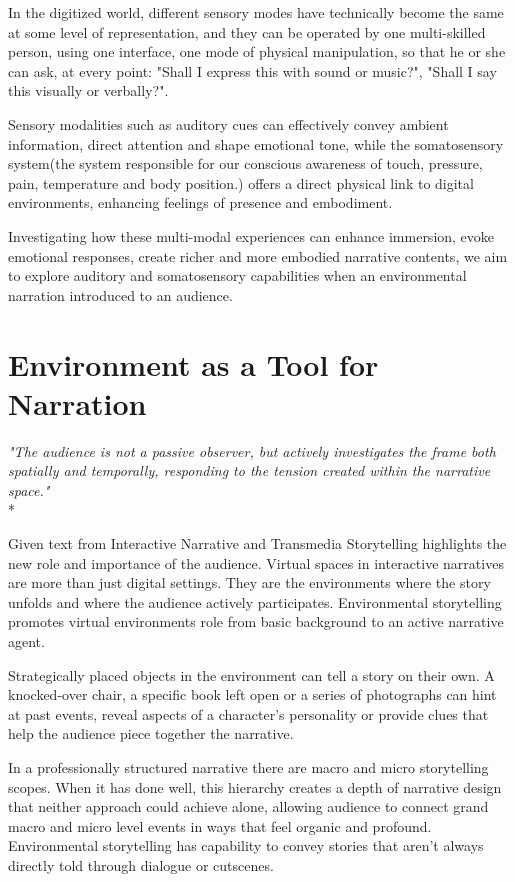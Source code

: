     In the digitized world, different sensory modes have technically become the same at some level of representation, and they can be operated by one multi-skilled person, using one interface, one mode of physical manipulation, so that he or she can ask, at every point: "Shall I express this with sound or music?", "Shall I say this visually or verbally?"\cite{Multimodal_Discourse}.

    Sensory modalities such as auditory cues can effectively convey ambient information, direct attention and shape emotional tone, while the somatosensory system(the system responsible for our conscious awareness of touch, pressure, pain, temperature and body position\cite{Somatic_Sensory}.) offers a direct physical link to digital environments, enhancing feelings of presence and embodiment. 

    Investigating how these multi-modal experiences can enhance immersion, evoke emotional responses, create richer and more embodied narrative contents, we aim to explore auditory and somatosensory capabilities when an environmental narration introduced to an audience.
    \section{Environment as a Tool for Narration} 
    \emph{"The audience is not a passive observer, but actively investigates the frame both spatially and temporally, responding to the tension created within the narrative space\cite{Transmedia_Storytelling}."}
    \\*

    Given text from Interactive Narrative and Transmedia Storytelling highlights the new role and importance of the audience. Virtual spaces in interactive narratives are more than just digital settings. They are the environments where the story unfolds and where the audience actively participates. Environmental storytelling promotes virtual environments role from basic background to an active narrative agent. 

    Strategically placed objects in the environment can tell a story on their own. A knocked-over chair, a specific book left open or a series of photographs can hint at past events, reveal aspects of a character's personality or provide clues that help the audience piece together the narrative\cite{Environmental_Storytelling_Blogpost}. 

    In a professionally structured narrative there are macro and micro storytelling scopes. When it has done well, this hierarchy creates a depth of narrative design that neither approach could achieve alone, allowing audience to connect grand macro and micro level events in ways that feel organic and profound\cite{Environmental_Storytelling_Blogpost}. Environmental storytelling has capability to convey stories that aren’t always directly told through dialogue or cutscenes.

